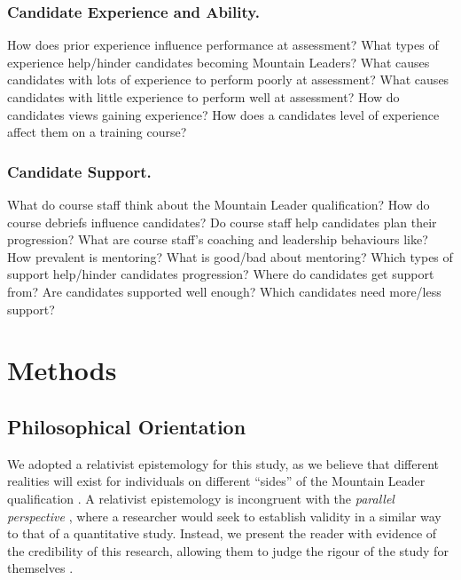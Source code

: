 \documentclass[
  12pt,
  a4paper,
]{book}
\begin{document}
\hypertarget{candidate-experience-and-ability.}{%
\subsubsection{Candidate Experience and Ability.}\label{candidate-experience-and-ability.}}

How does prior experience influence performance at assessment? What types of experience help/hinder candidates becoming Mountain Leaders? What causes candidates with lots of experience to perform poorly at assessment? What causes candidates with little experience to perform well at assessment? How do candidates views gaining experience? How does a candidates level of experience affect them on a training course?

\hypertarget{candidate-support.}{%
\subsubsection{Candidate Support.}\label{candidate-support.}}

What do course staff think about the Mountain Leader qualification? How do course debriefs influence candidates? Do course staff help candidates plan their progression? What are course staff's coaching and leadership behaviours like? How prevalent is mentoring? What is good/bad about mentoring? Which types of support help/hinder candidates progression? Where do candidates get support from? Are candidates supported well enough? Which candidates need more/less support?

\hypertarget{methods}{%
\section{Methods}\label{methods}}

\hypertarget{philosophical-orientation}{%
\subsection{Philosophical Orientation}\label{philosophical-orientation}}

We adopted a relativist epistemology for this study, as we believe that different realities will exist for individuals on different ``sides'' of the Mountain Leader qualification \citep[e.g., candidates and course staff;][]{Sparkes2009}. A relativist epistemology is incongruent with the \emph{parallel perspective} \citep{Sparkes1998}, where a researcher would seek to establish validity in a similar way to that of a quantitative study. Instead, we present the reader with evidence of the credibility of this research, allowing them to judge the rigour of the study for themselves \citep{Sparkes2009}.
\end{document}
